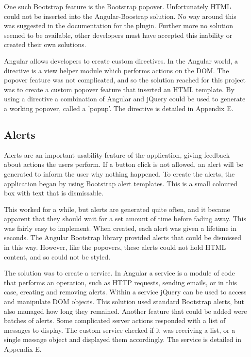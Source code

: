 One such Bootstrap feature is the Bootstrap popover. Unfortunately HTML could not be inserted into the Angular-Boostrap solution. No way around this was suggested in the documentation for the plugin. Further more no solution seemed to be available, other developers must have accepted this inability or created their own solutions. 

Angular allows developers to create custom directives. In the Angular world, a directive is a view helper module which performs actions on the DOM. The popover feature was not complicated, and so the solution reached for this project was to create a custom popover feature that inserted an HTML template. By using a directive a combination of Angular and jQuery could be used to generate a working popover, called a 'popup'. The directive is detailed in Appendix E.

\subsection{Alerts}
Alerts are an important usability feature of the application, giving feedback about actions the users perform. If a button click is not allowed, an alert will be generated to inform the user why nothing happened. To create the alerts, the application began by using Bootstrap alert templates. This is a small coloured box with text that is dismissable. 

This worked for a while, but alerts are generated quite often, and it became apparent that they should wait for a set amount of time before fading away. This was fairly easy to implement. When created, each alert was given a lifetime in seconds. The Angular Bootstrap library provided alerts that could be dismissed in this way. However, like the popovers, these alerts could not hold HTML content, and so could not be styled.

The solution was to create a service. In Angular a service is a module of code that performs an operation, such as HTTP requests, sending emails, or in this case, creating and removing alerts. Within a service jQuery can be used to access and manipulate DOM objects. This solution used standard Bootstrap alerts, but also managed how long they remained. Another feature that could be added were batches of alerts. Some complicated server actions responded with a list of messages to display. The custom service checked if it was receiving a list, or a single message object and displayed them accordingly. The service is detailed in Appendix E.

